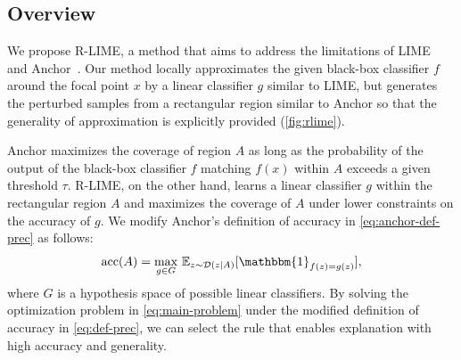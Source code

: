 \documentclass[runningheads]{llncs}
\begin{document}
{\subsection{Overview}
We propose R-LIME,
a method that aims to address the limitations of LIME~\cite{ribeiro2016why}
and Anchor~\cite{ribeiro2018anchors}.
Our method locally approximates the given black-box classifier $f$
around the focal point $x$ by a linear classifier $g$ similar to LIME,
but generates the perturbed samples
from a rectangular region similar to Anchor
so that the generality of approximation is explicitly provided
(\cref{fig:rlime}).

Anchor maximizes the coverage of region $A$
as long as the probability of the output of the black-box classifier $f$ matching $f(x)$
within $A$ exceeds a given threshold $\tau$.
R-LIME, on the other hand, learns a linear classifier $g$
within the rectangular region $A$ and maximizes the coverage of $A$
under lower constraints on the accuracy of $g$.
We modify Anchor's definition of accuracy in \cref{eq:anchor-def-prec}
as follows:
\begin{equation}
  \Prec(A)=\underset{g\in G}{\max}\ \mathbb{E}_{z\sim\mathcal{D}(z|A)}
  [\mathbbm{1}_{f(z)=g(z)}], \label{eq:def-prec}
\end{equation}
where $G$ is a hypothesis space of possible linear classifiers.
By solving the optimization problem in \cref{eq:main-problem}
under the modified definition of accuracy in \cref{eq:def-prec},
we can select the rule that enables explanation with high accuracy and generality.

}
\end{document}
